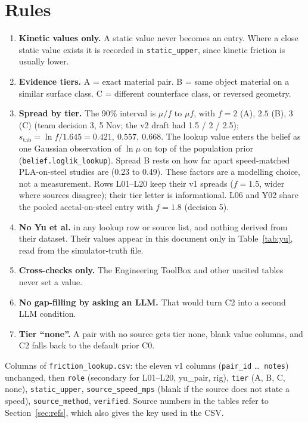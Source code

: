 \documentclass[11pt]{article}
\begin{document}
\section{Rules}\label{sec:rules}
\begin{enumerate}
 \item \textbf{Kinetic values only.} A static value never becomes an entry. Where a close static value exists it is recorded in \texttt{static\_upper}, since kinetic friction is usually lower.
 \item \textbf{Evidence tiers.} A = exact material pair. B = same object material on a similar surface class. C = different counterface class, or reversed geometry.
 \item \textbf{Spread by tier.} The 90\% interval is $\mu/f$ to $\mu f$, with $f = 2$ (A), $2.5$ (B), $3$ (C) (team decision 3, 5 Nov; the v2 draft had 1.5 / 2 / 2.5); $s_{\text{tab}} = \ln f / 1.645 = 0.421,\ 0.557,\ 0.668$. The lookup value enters the belief as one Gaussian observation of $\ln\mu$ on top of the population prior (\texttt{belief.loglik\_lookup}). Spread B rests on how far apart speed-matched PLA-on-steel studies are (0.23 to 0.49). These factors are a modelling choice, not a measurement. Rows L01--L20 keep their v1 spreads ($f = 1.5$, wider where sources disagree); their tier letter is informational. L06 and Y02 share the pooled acetal-on-steel entry with $f = 1.8$ (decision 5).
 \item \textbf{No Yu et al.} in any lookup row or source list, and nothing derived from their dataset. Their values appear in this document only in Table~\ref{tab:yu}, read from the simulator-truth file.
 \item \textbf{Cross-checks only.} The Engineering ToolBox and other uncited tables never set a value.
 \item \textbf{No gap-filling by asking an LLM.} That would turn C2 into a second LLM condition.
 \item \textbf{Tier ``none''.} A pair with no source gets tier none, blank value columns, and C2 falls back to the default prior C0.
\end{enumerate}
Columns of \texttt{friction\_lookup.csv}: the eleven v1 columns (\texttt{pair\_id} \ldots\ \texttt{notes}) unchanged, then \texttt{role} (secondary for L01--L20, yu\_pair, rig), \texttt{tier} (A, B, C, none), \texttt{static\_upper}, \texttt{source\_speed\_mps} (blank if the source does not state a speed), \texttt{source\_method}, \texttt{verified}. Source numbers in the tables refer to Section~\ref{sec:refs}, which also gives the key used in the CSV.
\end{document}
